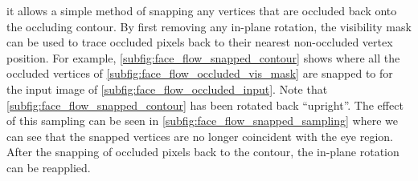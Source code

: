 it allows a simple method of snapping any vertices that are occluded back
onto the occluding contour. By first removing any in-plane rotation, the
visibility mask can be used to trace occluded pixels back to their nearest
non-occluded vertex position. For example, \cref{subfig:face_flow_snapped_contour}
shows where all the occluded vertices of \cref{subfig:face_flow_occluded_vis_mask}
are snapped to for the input image of \cref{subfig:face_flow_occluded_input}.
Note that \cref{subfig:face_flow_snapped_contour} has been rotated back
``upright''. The effect of this sampling can be seen in
\cref{subfig:face_flow_snapped_sampling} where we can see that the snapped
vertices are no longer coincident with the eye region. After the snapping of
occluded pixels back to the contour, the in-plane rotation can be reapplied.

